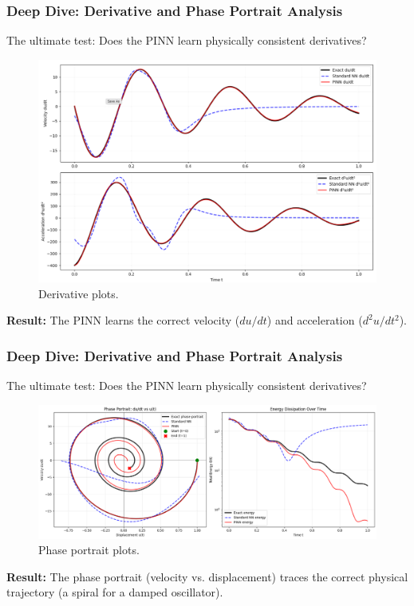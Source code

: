 \documentclass[notes]{beamer}
\begin{document}
\begin{frame}
\frametitle{Deep Dive: Derivative and Phase Portrait Analysis}

The ultimate test: Does the PINN learn physically consistent derivatives?

\begin{figure}[ht]
	\centering
	\includegraphics[width=\textwidth]{figs/derivative-comparison.png}
	\caption*{Derivative  plots.}
\end{figure}

\textbf{Result:} The PINN learns the correct velocity ($du/dt$) and acceleration ($d^2u/dt^2$).

\end{frame}

\begin{frame}
	\frametitle{Deep Dive: Derivative and Phase Portrait Analysis}
	
	The ultimate test: Does the PINN learn physically consistent derivatives?
	
	\begin{figure}[ht]
		\centering
		\includegraphics[width=\textwidth]{figs/oscillator-phase-portrait.png}
		\caption*{Phase portrait plots.}
	\end{figure}
	
	\textbf{Result:} The phase portrait (velocity vs. displacement) traces the correct physical trajectory (a spiral for a damped oscillator).
	
\end{frame}
\end{document}
